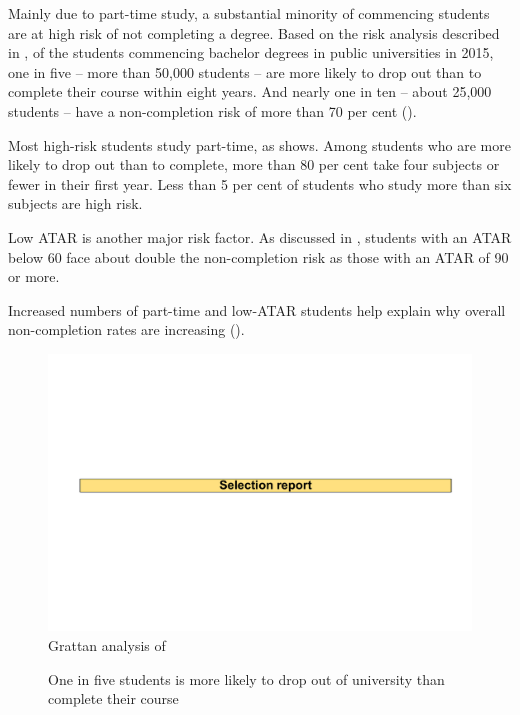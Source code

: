 Mainly due to part-time study, a substantial minority of commencing students are at high risk of not completing a degree. Based on the risk analysis described in , of the students commencing bachelor degrees in public universities in 2015, one in five -- more than 50,000 students -- are more likely to drop out than to complete their course within eight years. And nearly one in ten -- about 25,000 students -- have a non-completion risk of more than 70 per cent ().

Most high-risk students study part-time, as  shows. Among students who are more likely to drop out than to complete, more than 80 per cent take four subjects or fewer in their first year. Less than 5 per cent of students who study more than six subjects are high risk.

Low ATAR is another major risk factor. As discussed in , students with an ATAR below 60 face about double the non-completion risk as those with an ATAR of 90 or more.

Increased numbers of part-time and low-ATAR students help explain why overall non-completion rates are increasing ().

                \begin{figure}
                    \caption{One in five students is more likely to drop out of university than complete their course\label{fig:21}}%
                    \includegraphics[page=27]{atlas/selection_chartdeck.pdf} 
                    {Grattan analysis of \textcite{DepartmentofEducationandTraininga}}
                \end{figure}


